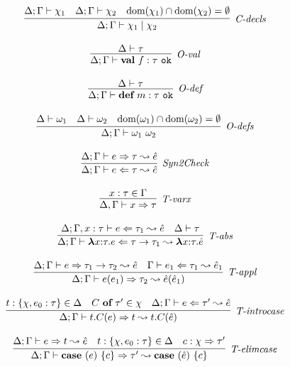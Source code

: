 \begin{figure}
\[\begin{array}{c}
\infer[\textit{C-decls}]
	{\Delta; \Gamma \vdash  \chi_1 \bnfalt \chi_2} 
	{\Delta; \Gamma \vdash \chi_1 & \Delta; \Gamma \vdash \chi_2 & \text{dom}(\chi_1) \intersect \text{dom}(\chi_2) = \emptyset}\\[3ex]

\infer[\textit{O-val}]
	{\Delta; \Gamma \vdash \keyw{val}~ f:\tau \ \texttt{ok} }
	{\Delta \vdash \tau} \\[3ex]
	
\infer[\textit{O-def}]
	{\Delta; \Gamma \vdash \keyw{def}~ m:\tau \ \texttt{ok} }
	{\Delta \vdash \tau } \\[3ex]

\infer[\textit{O-defs}]
	{\Delta; \Gamma \vdash \omega_1\ \omega_2  }
	{\Delta \vdash \omega_1 & \Delta \vdash \omega_2 & \text{dom}(\omega_1) \intersect \text{dom}(\omega_2) = \emptyset } \\[3ex]

\infer[\textit{Syn2Check}]
	{\Delta; \Gamma \vdash  e \Leftarrow \tau \leadsto \hat{e}} 
	{\Delta;\Gamma \vdash e \Rightarrow \tau \leadsto \hat{e}   }\\[3ex]
	
\infer[\textit{T-varx}]
	{\Delta,\Gamma \vdash x\Rightarrow\tau } 
	{x:\tau \in \Gamma }\\[3ex]

\infer[\textit{T-abs}]
	{\Delta; \Gamma \vdash  \boldsymbol\lambda x{:}\tau . e \Leftarrow \tau \rightarrow \tau_1 \leadsto \boldsymbol\lambda x{:}\tau .\hat{e}} 
	{\Delta; \Gamma, x:\tau \vdash e\Leftarrow \tau_1 \leadsto \hat{e}  & \Delta\vdash \tau}\\[3ex]

\infer[\textit{T-appl}]
	{\Delta; \Gamma \vdash  e(e_1) \Rightarrow \tau_2  \leadsto \hat{e}(\hat{e}_1) } 
	{\Delta; \Gamma \vdash e \Rightarrow \tau_1 \rightarrow \tau_2  \leadsto \hat{e}  & \Gamma \vdash e_1 \Leftarrow \tau_1 \leadsto \hat{e}_1 }\\[3ex]

\infer[\textit{T-introcase}]
	{\Delta; \Gamma \vdash  t.C(e) \Rightarrow t  \leadsto t.C(\hat{e}) } 
	{t:\{\chi, e_0:\tau\} \in \Delta & C\ \keyw{of}\ \tau' \in \chi &\Delta; \Gamma \vdash e \Leftarrow \tau'  \leadsto \hat{e}}\\[3ex]

\infer[\textit{T-elimcase}]
	{\Delta; \Gamma \vdash  \keyw{case}~(e)~\{ c \} \Rightarrow \tau'  \leadsto \keyw{case}~(\hat{e})~\{ c \} } 
	{\Delta; \Gamma \vdash e \Rightarrow t  \leadsto \hat{e}  & t:\{ \chi,e_0:\tau\} \in \Delta & c:\chi \Rightarrow \tau'}\\[3ex]


\end{array}\]
\end{figure}

